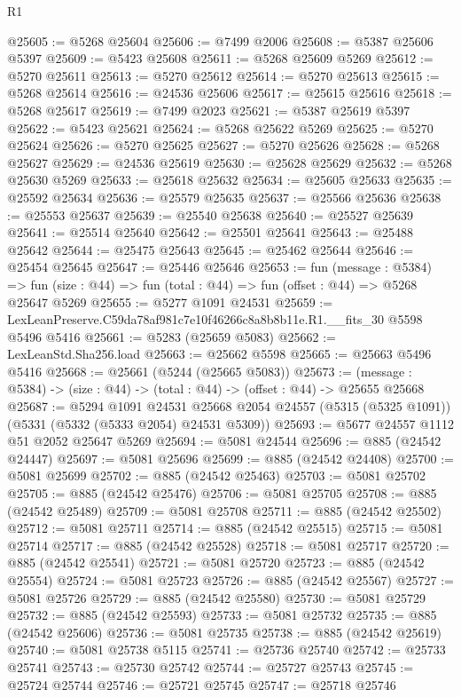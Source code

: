 \begin{lexlean}{R1}
\begin{coremodule}
@25605 := @5268 @25604
@25606 := @7499 @2006
@25608 := @5387 @25606 @5397
@25609 := @5423 @25608
@25611 := @5268 @25609 @5269
@25612 := @5270 @25611
@25613 := @5270 @25612
@25614 := @5270 @25613
@25615 := @5268 @25614
@25616 := @24536 @25606
@25617 := @25615 @25616
@25618 := @5268 @25617
@25619 := @7499 @2023
@25621 := @5387 @25619 @5397
@25622 := @5423 @25621
@25624 := @5268 @25622 @5269
@25625 := @5270 @25624
@25626 := @5270 @25625
@25627 := @5270 @25626
@25628 := @5268 @25627
@25629 := @24536 @25619
@25630 := @25628 @25629
@25632 := @5268 @25630 @5269
@25633 := @25618 @25632
@25634 := @25605 @25633
@25635 := @25592 @25634
@25636 := @25579 @25635
@25637 := @25566 @25636
@25638 := @25553 @25637
@25639 := @25540 @25638
@25640 := @25527 @25639
@25641 := @25514 @25640
@25642 := @25501 @25641
@25643 := @25488 @25642
@25644 := @25475 @25643
@25645 := @25462 @25644
@25646 := @25454 @25645
@25647 := @25446 @25646
@25653 := fun (message : @5384) =>
  fun (size : @44) => fun (total : @44) => fun (offset : @44) => @5268 @25647 @5269
@25655 := @5277 @1091 @24531
@25659 := LexLeanPreserve.C59da78af981c7e10f46266c8a8b8b11e.R1.__fits_30 @5598 @5496 @5416
@25661 := @5283 (@25659 @5083)
@25662 := LexLeanStd.Sha256.load
@25663 := @25662 @5598
@25665 := @25663 @5496 @5416
@25668 := @25661 (@5244 (@25665 @5083))
@25673 := (message : @5384) -> (size : @44) -> (total : @44) -> (offset : @44) -> @25655 @25668
@25687 := @5294
    @1091
    @24531
    @25668
    @2054
    @24557
    (@5315 (@5325 @1091))
    (@5331 (@5332 (@5333 @2054) @24531 @5309))
@25693 := @5677 @24557 @1112 @51 @2052 @25647 @5269
@25694 := @5081 @24544
@25696 := @885 (@24542 @24447)
@25697 := @5081 @25696
@25699 := @885 (@24542 @24408)
@25700 := @5081 @25699
@25702 := @885 (@24542 @25463)
@25703 := @5081 @25702
@25705 := @885 (@24542 @25476)
@25706 := @5081 @25705
@25708 := @885 (@24542 @25489)
@25709 := @5081 @25708
@25711 := @885 (@24542 @25502)
@25712 := @5081 @25711
@25714 := @885 (@24542 @25515)
@25715 := @5081 @25714
@25717 := @885 (@24542 @25528)
@25718 := @5081 @25717
@25720 := @885 (@24542 @25541)
@25721 := @5081 @25720
@25723 := @885 (@24542 @25554)
@25724 := @5081 @25723
@25726 := @885 (@24542 @25567)
@25727 := @5081 @25726
@25729 := @885 (@24542 @25580)
@25730 := @5081 @25729
@25732 := @885 (@24542 @25593)
@25733 := @5081 @25732
@25735 := @885 (@24542 @25606)
@25736 := @5081 @25735
@25738 := @885 (@24542 @25619)
@25740 := @5081 @25738 @5115
@25741 := @25736 @25740
@25742 := @25733 @25741
@25743 := @25730 @25742
@25744 := @25727 @25743
@25745 := @25724 @25744
@25746 := @25721 @25745
@25747 := @25718 @25746

\end{coremodule}
\end{lexlean}
